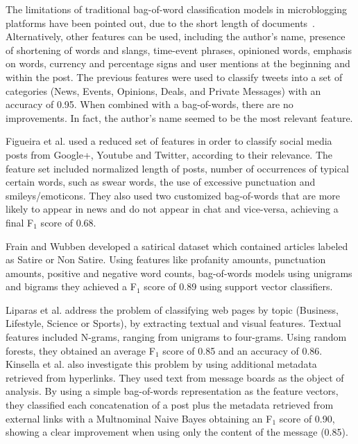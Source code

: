 The limitations of traditional bag-of-word classification models in microblogging platforms have been pointed out, due to the short length of documents~\cite{Bharath2010TwitterFiltering}.
Alternatively, other features can be used, including the author's name, presence of shortening of words and slangs, time-event phrases, opinioned words, emphasis on words, currency and percentage signs and user mentions at the beginning and within the post.
The previous features were used to classify tweets into a set of categories (News, Events, Opinions, Deals, and Private Messages) with an accuracy of 0.95. When combined with a bag-of-words, there are no improvements. In fact, the author's name seemed to be the most relevant feature. 

Figueira et al. \citep{Figueira2016RelevanceDetection} used a reduced set of features in order to classify social media posts from Google+, Youtube and Twitter, according to their relevance. The feature set included normalized length of posts, number of occurrences of typical certain words, such as swear words, the use of excessive punctuation and smileys/emoticons. They also used two customized bag-of-words that are more likely to appear in news and do not appear in chat and vice-versa, achieving a final F$_1$ score of 0.68.

Frain and Wubben \citep{Frain2016SatiricLR} developed a satirical dataset which contained articles labeled as Satire or Non Satire. Using features like profanity amounts, punctuation amounts, positive and negative word counts, bag-of-words models using unigrams and bigrams they achieved a F$_1$ score of 0.89 using support vector classifiers.	

Liparas et al.\citep{Liparas2014NewsClassification} address the problem of classifying web pages by topic (Business, Lifestyle, Science or Sports), by extracting textual and visual features. Textual features included N-grams, ranging from unigrams to four-grams. Using random forests, they obtained an average F$_1$ score of 0.85 and an accuracy of 0.86. Kinsella et al. \citep{Kinsella2011TopicClassification} also investigate this problem by using additional metadata retrieved from hyperlinks. They used text from message boards as the object of analysis. By using a simple bag-of-words representation as the feature vectors, they classified each concatenation of a post plus the metadata retrieved from external links with a Multnominal Naive Bayes obtaining an F$_1$ score of 0.90, showing a clear improvement when using only the content of the message (0.85).  

